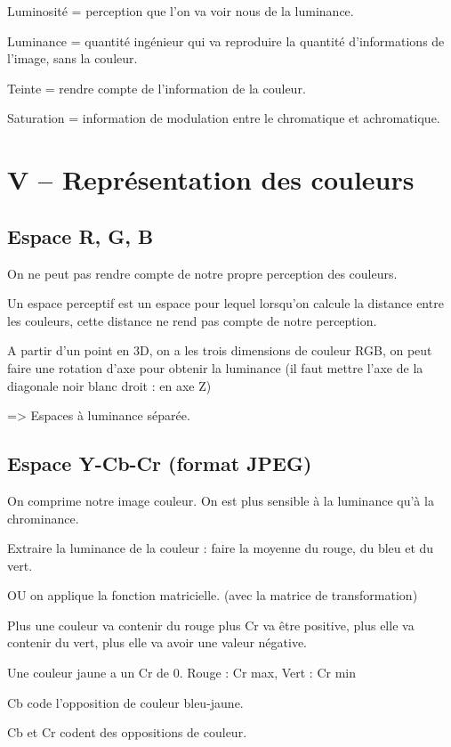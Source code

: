 \documentclass{report}
\begin{document}
Luminosité = perception que l'on va voir nous de la luminance.

Luminance = quantité ingénieur qui va reproduire la quantité d'informations de l'image, sans la couleur.

Teinte = rendre compte de l'information de la couleur.

Saturation = information de modulation entre le chromatique et achromatique.


\section*{V – Représentation des couleurs}

\subsection*{Espace R, G, B}

On ne peut pas rendre compte de notre propre perception des couleurs. 

Un espace perceptif est un espace pour lequel lorsqu'on calcule la distance entre les couleurs, cette distance ne rend pas compte de notre perception.

A partir d'un point en 3D, on a les trois dimensions de couleur RGB, on peut faire une rotation d'axe pour obtenir la luminance (il faut mettre l'axe de la diagonale noir blanc droit : en axe Z)

=> Espaces à luminance séparée.

\subsection*{Espace Y-Cb-Cr (format JPEG)}

On comprime notre image couleur. On est plus sensible à la luminance qu'à la chrominance.

Extraire la luminance de la couleur : faire la moyenne du rouge, du bleu et du vert.

OU on applique la fonction matricielle. (avec la matrice de transformation)

Plus une couleur va contenir du rouge plus Cr va être positive, plus elle va contenir du vert, plus elle va avoir une valeur négative.

Une couleur jaune a un Cr de 0. Rouge : Cr max, Vert : Cr min

Cb code l'opposition de couleur bleu-jaune.

Cb et Cr codent des oppositions de couleur.
\end{document}
